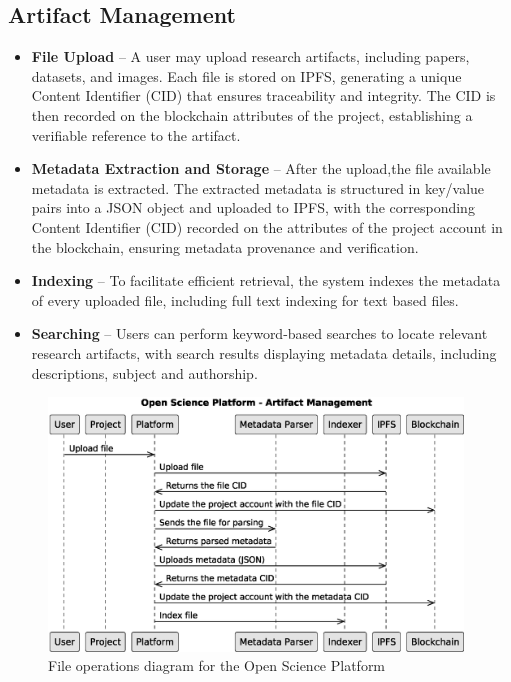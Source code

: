 \documentclass{article}
\begin{document}
\subsection{Artifact Management}

\begin{itemize}
    \item \textbf{File Upload} – A user may upload research artifacts, including papers, datasets, and images. Each file is stored on IPFS, generating a unique Content Identifier (CID) that ensures traceability and integrity. The CID is then recorded on the blockchain attributes of the project, establishing a verifiable reference to the artifact.

    \item \textbf{Metadata Extraction and Storage} – After the upload,the file available metadata is extracted. The extracted metadata is structured in key/value pairs into a JSON object and uploaded to IPFS, with the corresponding Content Identifier (CID) recorded on the attributes of the project account in the blockchain, ensuring metadata provenance and verification.

    \item \textbf{Indexing} – To facilitate efficient retrieval, the system indexes the metadata of every uploaded file, including full text indexing for text based files.

    \item \textbf{Searching} – Users can perform keyword-based searches to locate relevant research artifacts, with search results displaying metadata details, including descriptions, subject and authorship.
\end{itemize}


\begin{figure}[htbp]
    \centering
    \includegraphics[width=0.98\textwidth, keepaspectratio]{c4_platform_operations_2}
    \caption{File operations diagram for the Open Science Platform}
    \label{fig:c4_file_operations_diagram}
\end{figure}
\end{document}
